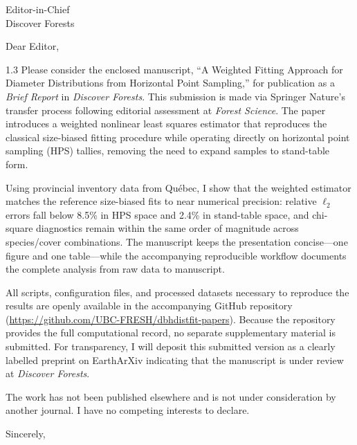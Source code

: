 \documentclass[12pt]{letter}
\begin{document}
\begin{letter}{Editor-in-Chief\\Discover Forests}
\opening{Dear Editor,}

\begin{spacing}{1.3}
Please consider the enclosed manuscript, ``A Weighted Fitting Approach for Diameter Distributions from Horizontal Point Sampling,'' for publication as a \emph{Brief Report} in \emph{Discover Forests}. This submission is made via Springer Nature's transfer process following editorial assessment at \emph{Forest Science}. The paper introduces a weighted nonlinear least squares estimator that reproduces the classical size-biased fitting procedure while operating directly on horizontal point sampling (HPS) tallies, removing the need to expand samples to stand-table form.

Using provincial inventory data from Qu\'ebec, I show that the weighted estimator matches the reference size-biased fits to near numerical precision: relative $\ell_2$ errors fall below 8.5\% in HPS space and 2.4\% in stand-table space, and chi-square diagnostics remain within the same order of magnitude across species/cover combinations. The manuscript keeps the presentation concise---one figure and one table---while the accompanying reproducible workflow documents the complete analysis from raw data to manuscript.

All scripts, configuration files, and processed datasets necessary to reproduce the results are openly available in the accompanying GitHub repository (\url{https://github.com/UBC-FRESH/dbhdistfit-papers}). Because the repository provides the full computational record, no separate supplementary material is submitted. For transparency, I will deposit this submitted version as a clearly labelled preprint on EarthArXiv indicating that the manuscript is under review at \emph{Discover Forests}.

The work has not been published elsewhere and is not under consideration by another journal. I have no competing interests to declare.
\end{spacing}

\closing{Sincerely,}
\end{letter}
\end{document}
